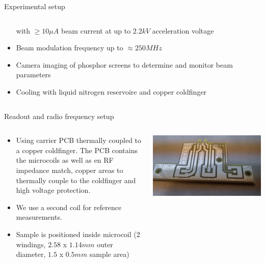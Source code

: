 \documentclass[final]{beamer}
\begin{document}
\begin{frame}[fragile]{}
\begin{columns}[T]
\begin{column}{.49\linewidth}
\begin{block}{\large Experimental setup}
\begin{columns}
\begin{column}{0.6\columnwidth}
\begin{itemize}
                    with $\geq 10 \mu A$ beam current at up to $2.2 kV$ acceleration voltage
                \item Beam modulation frequency up to $\approx 250 MHz$
                \item Camera imaging of phosphor screens to determine and monitor beam parameters
                \item Cooling with liquid nitrogen reservoire and copper coldfinger
              \end{itemize}
          \end{column}
        \end{columns}
      \end{block}

      \begin{block}{\large Readout and radio frequency setup}
        \begin{columns}
          \begin{column}{0.6\columnwidth}
            \begin{itemize}
              \item Using carrier PCB thermally coupled to a copper coldfinger. The
                    PCB contains the microcoils as well as en RF impedance match,
                    copper areas to thermally couple to the coldfinger and high voltage
                    protection.
              \item We use a second coil for reference measurements.
              \item Sample is positioned inside microcoil (2 windings, $2.58$ x $1.14mm$
                    outer diameter, $1.5$ x $0.5mm$ sample area)
            \end{itemize}
          \end{column}
          \begin{column}{0.4\columnwidth}
            \includegraphics[width=\columnwidth]{figures/pcb01.jpg}


\end{column}
\end{columns}
\end{block}
\end{column}
\end{columns}
\end{frame}
\end{document}
